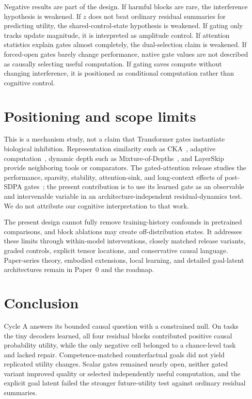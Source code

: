 \documentclass[10pt]{article}
\begin{document}
Negative results are part of the design. If harmful blocks are rare, the interference hypothesis is weakened. If $z$ does not beat ordinary residual summaries for predicting utility, the shared-control-state hypothesis is weakened. If gating only tracks update magnitude, it is interpreted as amplitude control. If attention statistics explain gates almost completely, the dual-selection claim is weakened. If forced-open gates barely change performance, native gate values are not described as causally selecting useful computation. If gating saves compute without changing interference, it is positioned as conditional computation rather than cognitive control.

\section{Positioning and scope limits}
This is a mechanism study, not a claim that Transformer gates instantiate biological inhibition. Representation similarity such as CKA~\cite{kornblith2019cka}, adaptive computation~\cite{graves2016act}, dynamic depth such as Mixture-of-Depths~\cite{raposo2024mod}, and LayerSkip~\cite{elbayad2024layerskip} provide neighboring tools or comparators. The gated-attention release studies the performance, sparsity, stability, attention-sink, and long-context effects of post-SDPA gates~\cite{qiu2025gatedattention}; the present contribution is to use its learned gate as an observable and intervenable variable in an architecture-independent residual-dynamics test. We do not attribute our cognitive interpretation to that work.

The present design cannot fully remove training-history confounds in pretrained comparisons, and block ablations may create off-distribution states. It addresses these limits through within-model interventions, closely matched release variants, graded controls, explicit tensor locations, and conservative causal language. Paper-series theory, embodied extensions, local learning, and detailed goal-latent architectures remain in Paper~0 and the roadmap.

\section{Conclusion}
Cycle A answers its bounded causal question with a constrained null. On tasks the tiny decoders learned, all four residual blocks contributed positive causal probability utility, while the only negative cell belonged to a chance-level task and lacked repair. Competence-matched counterfactual goals did not yield replicated utility changes. Scalar gates remained nearly open, neither gated variant improved quality or selected independently useful computation, and the explicit goal latent failed the stronger future-utility test against ordinary residual summaries.
\end{document}
